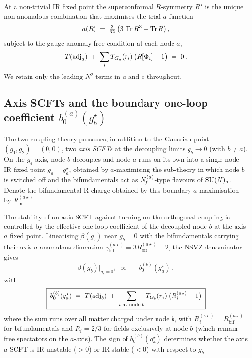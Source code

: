 At a non-trivial IR fixed point the superconformal $R$-symmetry
$R^{\star}$ is the unique non-anomalous combination that maximises
the trial $a$-function~\cite{IntriligatorWecht2003}
\begin{equation}
  a(R)\;=\;\tfrac{3}{32}\,\bigl(3\,\operatorname{Tr} R^{3}-\operatorname{Tr} R\bigr)\,,
  \label{eq:a-trial}
\end{equation}
subject to the gauge-anomaly-free condition at each node $a$,
\begin{equation}
  T(\mathrm{adj}_{a})\;+\;\sum_{i}T_{G_{a}}(r_{i})\,\bigl(R[\Phi_{i}]-1\bigr)\;=\;0\,.
  \label{eq:anomaly-free}
\end{equation}
We retain only the leading $N^{2}$ terms in $a$ and $c$ throughout.

\subsection{Axis SCFTs and the boundary one-loop coefficient
  \texorpdfstring{$b_{0}^{(a)}(g_{b}^{\star})$}{b0(a)(gb*)}}
\label{sec:setup-boundary}

The two-coupling theory possesses, in addition to the Gaussian point
$(g_{1},g_{2})=(0,0)$, two \emph{axis SCFTs} at the decoupling limits
$g_{b}\to 0$ (with $b\ne a$).  On the $g_{a}$-axis, node $b$ decouples
and node $a$ runs on its own into a single-node IR fixed point
$g_{a}=g_{a}^{\star}$, obtained by $a$-maximising the sub-theory in
which node $b$ is switched off and the bifundamentals act as
$N_{\!f}^{(a)}$-type flavours of $\mathrm{SU}(N)_{a}$.  Denote the bifundamental
R-charge obtained by this boundary $a$-maximisation by
$R_{\text{bif}}^{(a\star)}$.

The stability of an axis SCFT against turning on the orthogonal
coupling is controlled by the effective one-loop coefficient of the
decoupled node $b$ at the axis-$a$ fixed point.  Linearising
$\beta(g_{b})$ near $g_{b}=0$ with the bifundamentals carrying their
axis-$a$ anomalous dimension
$\gamma_{\text{bif}}^{(a\star)}=3R_{\text{bif}}^{(a\star)}-2$, the NSVZ
denominator gives
\begin{equation}
  \beta(g_{b})\Big|_{g_{b}=0^{+}}\;\propto\;-\,b_{0}^{(b)}(g_{a}^{\star})\,,
\end{equation}
with
\begin{equation}
  \boxed{\;
  b_{0}^{(b)}(g_{a}^{\star})\;=\;T(\mathrm{adj}_{b})\;+\;\sum_{i\text{ at node }b}
    T_{G_{b}}(r_{i})\,\bigl(R_{i}^{(a\star)}-1\bigr)\;}
  \label{eq:b0-boundary}
\end{equation}
where the sum runs over all matter charged under node $b$, with
$R_{i}^{(a\star)}=R_{\text{bif}}^{(a\star)}$ for bifundamentals and
$R_{i}=2/3$ for fields exclusively at node $b$ (which remain free
spectators on the $a$-axis).  The sign of $b_{0}^{(b)}(g_{a}^{\star})$
determines whether the axis $a$ SCFT is
IR-unstable ($>0$) or IR-stable ($<0$) with respect to $g_{b}$.

